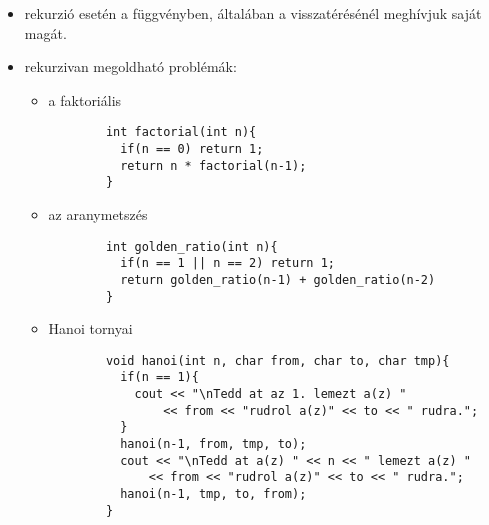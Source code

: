 \documentclass[main.tex]{subfiles}
\begin{document}
  \begin{itemize}
    \item rekurzió esetén a függvényben, általában
    a visszatérésénél meghívjuk saját magát.

    \item rekurzivan megoldható problémák:
    \begin{itemize}
      \item a faktoriális
      \begin{lstlisting}
        int factorial(int n){
          if(n == 0) return 1;
          return n * factorial(n-1);
        }
      \end{lstlisting}

      \item az aranymetszés
      \begin{lstlisting}
        int golden_ratio(int n){
          if(n == 1 || n == 2) return 1;
          return golden_ratio(n-1) + golden_ratio(n-2)
        }
      \end{lstlisting}

      \item Hanoi tornyai
      \begin{lstlisting}
        void hanoi(int n, char from, char to, char tmp){
          if(n == 1){
            cout << "\nTedd at az 1. lemezt a(z) "
                << from << "rudrol a(z)" << to << " rudra.";
          }
          hanoi(n-1, from, tmp, to);
          cout << "\nTedd at a(z) " << n << " lemezt a(z) "
              << from << "rudrol a(z)" << to << " rudra.";
          hanoi(n-1, tmp, to, from);
        }
      \end{lstlisting}
    \end{itemize}
  \end{itemize}
\end{document}
